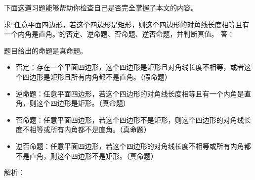 下面这道习题能够帮助你检查自己是否完全掌握了本文的内容。
\begin{exercise}{求“任意平面四边形，若这个四边形是矩形，则这个四边形的对角线长度相等且有一个内角是直角。”的否定、逆命题、否命题、逆否命题，并判断真值。}
答：

题目给出的命题是真命题。
\begin{itemize}
\item 否定：存在一个平面四边形，这个四边形是矩形且对角线长度不相等，或者这个四边形是矩形且所有内角都不是直角。（假命题）
\item 逆命题：任意平面四边形，若这个四边形的对角线长度相等且有一个内角是直角，则这个四边形是矩形。（真命题）
\item 否命题：任意平面四边形，若这个四边形不是矩形，则这个四边形的对角线长度不相等或所有内角都不是直角。（真命题）
\item 逆否命题：任意平面四边形，若这个四边形的对角线长度不相等或所有内角都不是直角，则这个四边形不是矩形。（真命题）
\end{itemize}

解析：


\end{exercise}
